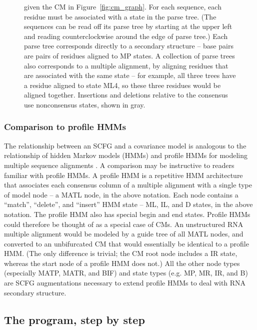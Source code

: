\begin{figure}[t]
{given the CM in Figure~\ref{fig:cm_graph}. For each sequence, each
residue must be associated with a state in the parse tree. (The
sequences can be read off its parse tree by starting at the upper left
and reading counterclockwise around the edge of parse tree.) Each
parse tree corresponds directly to a secondary structure -- base pairs
are pairs of residues aligned to MP states. A collection of parse
trees also corresponds to a multiple alignment, by aligning residues
that are associated with the same state -- for example, all three
trees have a residue aligned to state ML4, so these three residues
would be aligned together. Insertions and deletions relative to the
consensus use nonconsensus states, shown in gray.}
\label{fig:parsetrees}
\end{figure}

\subsubsection{Comparison to profile HMMs}

The relationship between an SCFG and a covariance model is analogous
to the relationship of hidden Markov models (HMMs) and profile HMMs
for modeling multiple sequence alignments
\citep{Krogh94,Durbin98,Eddy98}. A comparison may be instructive to
readers familiar with profile HMMs.  A profile HMM is a repetitive HMM
architecture that associates each consensus column of a multiple
alignment with a single type of model node -- a MATL node, in the
above notation. Each node contains a ``match'', ``delete'', and
``insert'' HMM state -- ML, IL, and D states, in the above notation.
The profile HMM also has special begin and end states. Profile HMMs
could therefore be thought of as a special case of CMs. An
unstructured RNA multiple alignment would be modeled by a guide tree
of all MATL nodes, and converted to an unbifurcated CM that would
essentially be identical to a profile HMM. (The only difference is
trivial; the CM root node includes a IR state, whereas the start node
of a profile HMM does not.) All the other node types (especially MATP,
MATR, and BIF) and state types (e.g. MP, MR, IR, and B) are SCFG
augmentations necessary to extend profile HMMs to deal with RNA
secondary structure.


\subsection{The  program, step by step}

